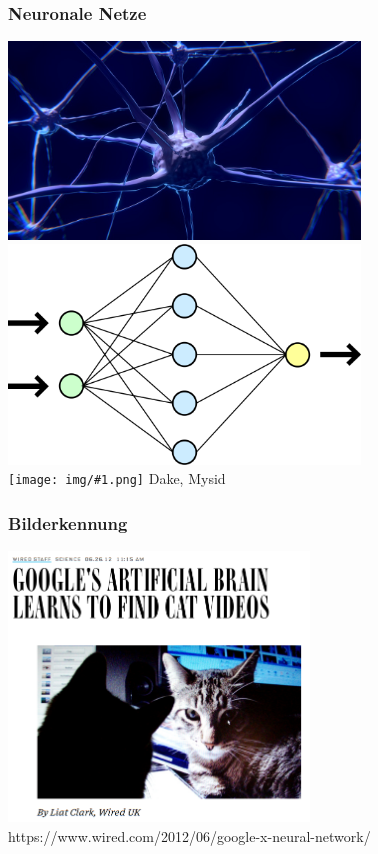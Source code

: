 \documentclass[12pt]{beamer}
\newcommand{\cc}[1]{\texttt{[image: img/\#1.png]}\hspace{1mm}}
\begin{document}
\begin{frame}
  \frametitle{Neuronale Netze}
  \begin{center}
     {
      \includegraphics[width=0.7\textwidth]{img/neuron.jpg} \\
    }
     {
      \includegraphics[width=0.7\textwidth]{img/network.png} \\
      \vspace{0.5cm}
      \tiny \cc{by} Dake, Mysid
    }
  \end{center}
\end{frame}

\begin{frame}
  \frametitle{Bilderkennung}
  \pause
  \begin{center}
    \includegraphics[width=0.6\textwidth]{img/cat_videos.png} \\
    \tiny https://www.wired.com/2012/06/google-x-neural-network/
  \end{center}
\end{frame}
\end{document}
